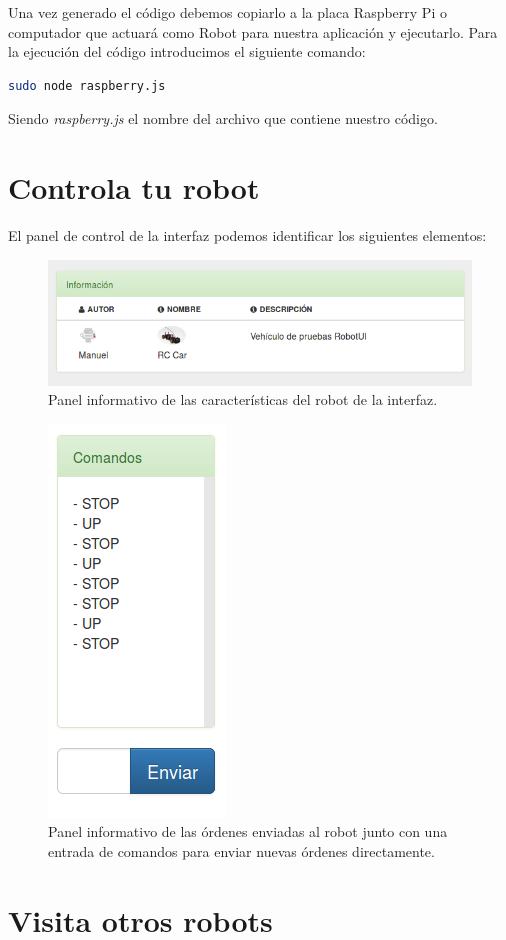 Una vez generado el código debemos copiarlo a la placa Raspberry Pi o computador que actuará como Robot para nuestra aplicación y ejecutarlo. Para la ejecución del código introducimos el siguiente comando:\\

\begin{lstlisting}[language=bash]
  sudo node raspberry.js
\end{lstlisting}

Siendo \emph{raspberry.js} el nombre del archivo que contiene nuestro código.


\section{ Controla tu robot }
\label{sec:control-robot}

El panel de control de la interfaz podemos identificar los siguientes elementos:

\begin{figure}[H]
  \begin{center}
    \includegraphics[scale=.6]{imagenes/manual-usuario/panel-robot-info.png}
  \end{center}
  \caption{ Panel informativo de las características del robot de la interfaz.}
  \label{website:pagina-principal}
\end{figure}


\begin{figure}[H]
  \begin{center}
    \includegraphics[scale=.6]{imagenes/manual-usuario/panel-comandos.png}
  \end{center}
  \caption{ Panel informativo de las órdenes enviadas al robot junto con una entrada de comandos para enviar nuevas órdenes directamente.}
  \label{website:pagina-principal}
\end{figure}


\section{ Visita otros robots }
\label{sec:visita-robot}